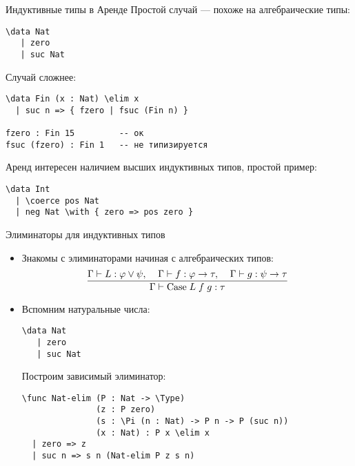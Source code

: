 \documentclass[aspectratio=169,dvipsnames,usenames]{beamer}
\begin{document}

\begin{frame}[fragile]{Индуктивные типы в Аренде}
Простой случай --- похоже на алгебраические типы:
\small\color[HTML]{025002}\begin{verbatim}
\data Nat 
   | zero
   | suc Nat
\end{verbatim}\normalsize
\color{black}

Случай сложнее:
\small\color[HTML]{025002}\begin{verbatim}
\data Fin (x : Nat) \elim x
  | suc n => { fzero | fsuc (Fin n) }

fzero : Fin 15         -- ок
fsuc (fzero) : Fin 1   -- не типизируется
\end{verbatim}
\color{black}


Аренд интересен наличием высших индуктивных типов, простой пример:

\small\color[HTML]{025002}\begin{verbatim}
\data Int
  | \coerce pos Nat
  | neg Nat \with { zero => pos zero }
\end{verbatim}\normalsize
\color{black}

\end{frame}

\begin{frame}[fragile]{Элиминаторы для индуктивных типов}
\begin{itemize}
\item Знакомы с элиминаторами начиная с алгебраических типов:
$$\infer{\Gamma \vdash \text{Case} \; L \; f \; g : \tau}{\Gamma \vdash L: \varphi \vee \psi, \;\;\;\; \Gamma \vdash f : \varphi \to \tau, \;\;\;\; \Gamma \vdash g: \psi \to \tau}$$

\item Вспомним натуральные числа:

\small\color[HTML]{025002}\begin{verbatim}
\data Nat 
   | zero
   | suc Nat
\end{verbatim}\normalsize
\color{black}

Построим зависимый элиминатор:

\small\color[HTML]{025002}\begin{verbatim}
\func Nat-elim (P : Nat -> \Type)
               (z : P zero)
               (s : \Pi (n : Nat) -> P n -> P (suc n))
               (x : Nat) : P x \elim x
  | zero => z
  | suc n => s n (Nat-elim P z s n)
\end{verbatim}\normalsize
\color{black}

\end{itemize}
\end{frame}
\end{document}
